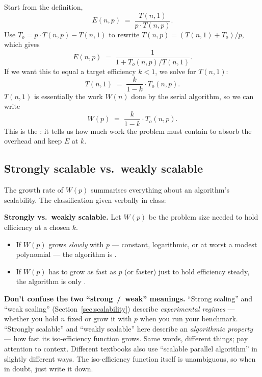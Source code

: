Start from the definition,
\[
E(n, p) \;=\; \frac{T(n,1)}{p \cdot T(n,p)}.
\]
Use $T_o = p \cdot T(n,p) - T(n,1)$ to rewrite
$T(n,p) = (T(n,1) + T_o)/p$, which gives
\[
E(n,p) \;=\; \frac{1}{1 + T_o(n,p)/T(n,1)}.
\]
If we want this to equal a target efficiency $k < 1$, we solve for $T(n,1)$:
\[
T(n,1) \;=\; \frac{k}{1-k}\cdot T_o(n,p).
\]
$T(n,1)$ is essentially the work $W(n)$ done by the serial algorithm, so
we can write
\[
W(p) \;=\; \frac{k}{1-k}\cdot T_o(n,p).
\]
This is the : it tells us how much work
the problem must contain to absorb the overhead and keep $E$ at $k$.

\subsection{Strongly scalable vs.\ weakly scalable}

The growth rate of $W(p)$ summarises everything about an algorithm's
scalability. The classification given verbally in class:

\begin{ppdefn}
\textbf{Strongly vs.\ weakly scalable.}
Let $W(p)$ be the problem size needed to hold efficiency at a chosen $k$.
\begin{itemize}
  \item If $W(p)$ grows \emph{slowly} with $p$ --- constant, logarithmic,
        or at worst a modest polynomial --- the algorithm is
        .
  \item If $W(p)$ has to grow as fast as $p$ (or faster) just to hold
        efficiency steady, the algorithm is only .
\end{itemize}
\end{ppdefn}

\begin{pppitfall}
\textbf{Don't confuse the two ``strong~/~weak'' meanings.}
``Strong scaling'' and ``weak scaling''
(Section~\ref{sec:scalability}) describe \emph{experimental regimes} ---
whether you hold $n$ fixed or grow it with $p$ when you run your benchmark.
``Strongly scalable'' and ``weakly scalable'' here describe an
\emph{algorithmic property} --- how fast its iso-efficiency function grows.
Same words, different things; pay attention to context. Different
textbooks also use ``scalable parallel algorithm'' in slightly different
ways. The iso-efficiency function itself is unambiguous, so when in doubt,
just write it down.
\end{pppitfall}

